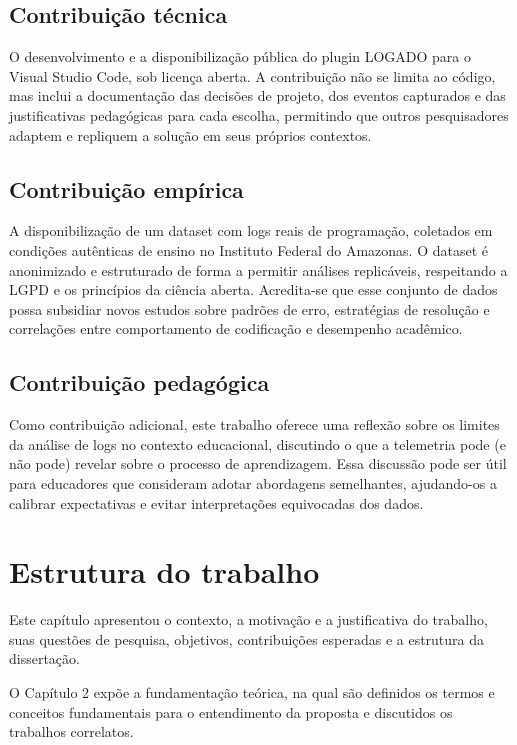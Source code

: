 \subsection*{Contribuição técnica}

O desenvolvimento e a disponibilização pública do plugin LOGADO para o Visual Studio Code, sob licença aberta. A contribuição não se limita ao código, mas inclui a documentação das decisões de projeto, dos eventos capturados e das justificativas pedagógicas para cada escolha, permitindo que outros pesquisadores adaptem e repliquem a solução em seus próprios contextos.

\subsection*{Contribuição empírica}

A disponibilização de um dataset com logs reais de programação, coletados em condições autênticas de ensino no Instituto Federal do Amazonas. O dataset é anonimizado e estruturado de forma a permitir análises replicáveis, respeitando a LGPD e os princípios da ciência aberta. Acredita-se que esse conjunto de dados possa subsidiar novos estudos sobre padrões de erro, estratégias de resolução e correlações entre comportamento de codificação e desempenho acadêmico.

\subsection*{Contribuição pedagógica}

Como contribuição adicional, este trabalho oferece uma reflexão sobre os limites da análise de logs no contexto educacional, discutindo o que a telemetria pode (e não pode) revelar sobre o processo de aprendizagem. Essa discussão pode ser útil para educadores que consideram adotar abordagens semelhantes, ajudando-os a calibrar expectativas e evitar interpretações equivocadas dos dados.

\section{Estrutura do trabalho}
\label{sec:estrutura-trabalho}

Este capítulo apresentou o contexto, a motivação e a justificativa do trabalho, suas questões de pesquisa, objetivos, contribuições esperadas e a estrutura da dissertação.

O Capítulo 2 expõe a fundamentação teórica, na qual são definidos os termos e conceitos fundamentais para o entendimento da proposta e discutidos os trabalhos correlatos.

